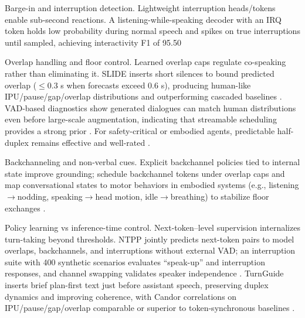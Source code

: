 \documentclass{article}
\begin{document}
Barge-in and interruption detection. Lightweight interruption heads/tokens enable sub-second reactions. A listening-while-speaking decoder with an IRQ token holds low probability during normal speech and spikes on true interruptions until sampled, achieving interactivity F1 of 95.50%

Overlap handling and floor control. Learned overlap caps regulate co-speaking rather than eliminating it. SLIDE inserts short silences to bound predicted overlap ($\le$0.3 s when forecasts exceed 0.6 s), producing human-like IPU/pause/gap/overlap distributions and outperforming cascaded baselines \cite{lu2025slideintegratingspeechlanguagemodelllmsp}. VAD-based diagnostics show generated dialogues can match human distributions even before large-scale augmentation, indicating that streamable scheduling provides a strong prior \cite{fu2024investigatingeffectslargescalepseudoster}. For safety-critical or embodied agents, predictable half-duplex remains effective and well-rated \cite{fu2025personalizedsociallyassistiverobotsendsp}.

Backchanneling and non-verbal cues. Explicit backchannel policies tied to internal state improve grounding; schedule backchannel tokens under overlap caps and map conversational states to motor behaviors in embodied systems (e.g., listening$\rightarrow$nodding, speaking$\rightarrow$head motion, idle$\rightarrow$breathing) to stabilize floor exchanges \cite{lu2025slideintegratingspeechlanguagemodelllmsp,fu2025personalizedsociallyassistiverobotsendsp}.

Policy learning vs inference-time control. Next-token--level supervision internalizes turn-taking beyond thresholds. NTPP jointly predicts next-token pairs to model overlaps, backchannels, and interruptions without external VAD; an interruption suite with 400 synthetic scenarios evaluates ``speak-up'' and interruption responses, and channel swapping validates speaker independence \cite{wang2025ntppgenerativespeechlanguagemodelingdual}. TurnGuide inserts brief plan-first text just before assistant speech, preserving duplex dynamics and improving coherence, with Candor correlations on IPU/pause/gap/overlap comparable or superior to token-synchronous baselines \cite{cui2025thinkbeforeyoutalkenhancingmeaningfuldia}.
\end{document}
